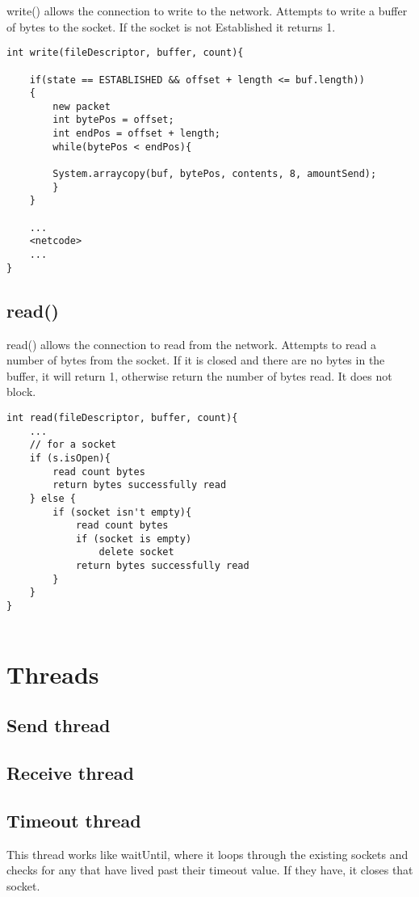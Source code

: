 \documentclass[]{article}
\begin{document}
write() allows the connection to write to the network. Attempts to write a buffer of bytes to
the socket. If the socket is not Established it returns 1.
\begin{lstlisting}
int write(fileDescriptor, buffer, count){
	
	if(state == ESTABLISHED && offset + length <= buf.length))
	{
		new packet
		int bytePos = offset;
		int endPos = offset + length;
		while(bytePos < endPos){
		
		System.arraycopy(buf, bytePos, contents, 8, amountSend);
		}
	}
	
	...
	<netcode>
	...
}
\end{lstlisting}

\subsection{read()}
read() allows the connection to read from the network. Attempts to read a number of bytes from the socket. If it is closed and there are no bytes in the buffer, it will return 1, otherwise return the number of bytes read. It does not block.
\begin{lstlisting}
int read(fileDescriptor, buffer, count){
	...
	// for a socket
	if (s.isOpen){
		read count bytes
		return bytes successfully read
	} else {
		if (socket isn't empty){
			read count bytes
			if (socket is empty)
				delete socket		
			return bytes successfully read	
		}	
	}
}


\end{lstlisting}

\section{Threads}



\subsection{Send thread}

\subsection{Receive thread}
\subsection{Timeout thread}
This thread works like waitUntil, where it loops through the existing sockets and checks for any that have lived past their timeout value. If they have, it closes that socket.
\end{document}
